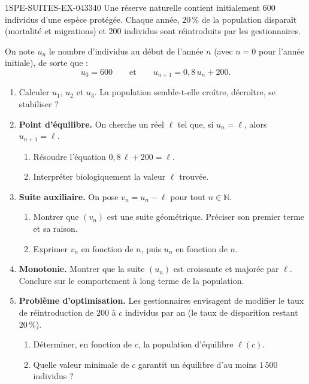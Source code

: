 \begin{exercice}{1SPE-SUITES-EX-043}{3}{40}
Une réserve naturelle contient initialement $600$ individus d'une espèce protégée. Chaque année, $20\,\%$ de la population disparaît (mortalité et migrations) et $200$ individus sont réintroduits par les gestionnaires.

On note $u_n$ le nombre d'individus au début de l'année $n$ (avec $n = 0$ pour l'année initiale), de sorte que :
\[
  u_0 = 600 \qquad \text{et} \qquad u_{n+1} = 0{,}8\, u_n + 200.
\]

\begin{enumerate}
  \item Calculer $u_1$, $u_2$ et $u_3$. La population semble-t-elle croître, décroître, se stabiliser ?

  \item \textbf{Point d'équilibre.} On cherche un réel $\ell$ tel que, si $u_n = \ell$, alors $u_{n+1} = \ell$.
  \begin{enumerate}
    \item Résoudre l'équation $0{,}8\,\ell + 200 = \ell$.
    \item Interpréter biologiquement la valeur $\ell$ trouvée.
  \end{enumerate}

  \item \textbf{Suite auxiliaire.} On pose $v_n = u_n - \ell$ pour tout $n \in \mathbb{N}$.
  \begin{enumerate}
    \item Montrer que $(v_n)$ est une suite géométrique. Préciser son premier terme et sa raison.
    \item Exprimer $v_n$ en fonction de $n$, puis $u_n$ en fonction de $n$.
  \end{enumerate}

  \item \textbf{Monotonie.} Montrer que la suite $(u_n)$ est croissante et majorée par $\ell$. Conclure sur le comportement à long terme de la population.

  \item \textbf{Problème d'optimisation.} Les gestionnaires envisagent de modifier le taux de réintroduction de $200$ à $c$ individus par an (le taux de disparition restant $20\,\%$).
  \begin{enumerate}
    \item Déterminer, en fonction de $c$, la population d'équilibre $\ell(c)$.
    \item Quelle valeur minimale de $c$ garantit un équilibre d'au moins $1\,500$ individus ?
  \end{enumerate}
\end{enumerate}
\end{exercice}
